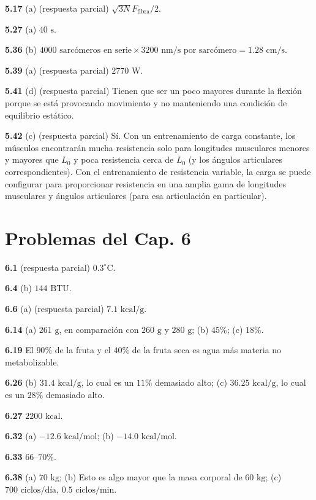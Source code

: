 \documentclass[12pt,a4paper]{book}
\begin{document}
\noindent \textbf{5.17} (a) (respuesta parcial) $\sqrt{3N} F_{\text{fibra}}/2$.

\noindent \textbf{5.27} (a) $40\text{ s}$.

\noindent \textbf{5.36} (b) $4000\text{ sarcómeros en serie} \times 3200\text{ nm/s por sarcómero} = 1.28\text{ cm/s}$.

\noindent \textbf{5.39} (a) (respuesta parcial) $2770\text{ W}$.

\noindent \textbf{5.41} (d) (respuesta parcial) Tienen que ser un poco mayores durante la flexión porque se está provocando movimiento y no manteniendo una condición de equilibrio estático.

\noindent \textbf{5.42} (c) (respuesta parcial) Sí. Con un entrenamiento de carga constante, los músculos encontrarán mucha resistencia solo para longitudes musculares menores y mayores que $L_0$ y poca resistencia cerca de $L_0$ (y los ángulos articulares correspondientes). Con el entrenamiento de resistencia variable, la carga se puede configurar para proporcionar resistencia en una amplia gama de longitudes musculares y ángulos articulares (para esa articulación en particular).

\section*{Problemas del Cap. 6}

\noindent \textbf{6.1} (respuesta parcial) $0.3^\circ\text{C}$.

\noindent \textbf{6.4} (b) $144\text{ BTU}$.

\noindent \textbf{6.6} (a) (respuesta parcial) $7.1\text{ kcal/g}$.

\noindent \textbf{6.14} (a) $261\text{ g}$, en comparación con $260\text{ g}$ y $280\text{ g}$; (b) $45\%$; (c) $18\%$.

\noindent \textbf{6.19} El $90\%$ de la fruta y el $40\%$ de la fruta seca es agua más materia no metabolizable.

\noindent \textbf{6.26} (b) $31.4\text{ kcal/g}$, lo cual es un $11\%$ demasiado alto; (c) $36.25\text{ kcal/g}$, lo cual es un $28\%$ demasiado alto.

\noindent \textbf{6.27} $2200\text{ kcal}$.

\noindent \textbf{6.32} (a) $-12.6\text{ kcal/mol}$; (b) $-14.0\text{ kcal/mol}$.

\noindent \textbf{6.33} $66\text{--}70\%$.

\noindent \textbf{6.38} (a) $70\text{ kg}$; (b) Esto es algo mayor que la masa corporal de $60\text{ kg}$; (c) $700\text{ ciclos/día}$, $0.5\text{ ciclos/min}$.
\end{document}
